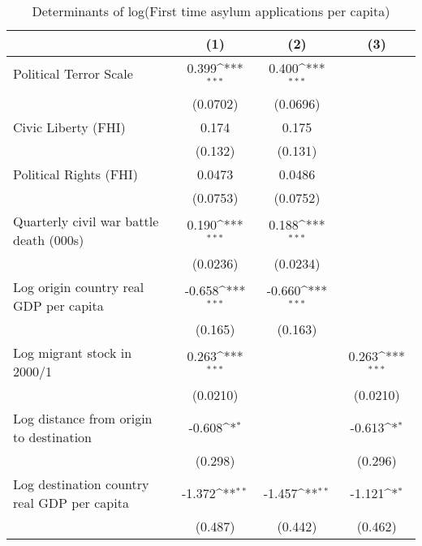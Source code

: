 \begin{table}[htbp]\centering
\def\sym#1{\ifmmode^{#1}\else\(^{#1}\)\fi}
\caption{Determinants of log(First time asylum applications per capita)}
\begin{tabular}{l*{3}{c}}
\hline\hline
                    &\multicolumn{1}{c}{(1)}         &\multicolumn{1}{c}{(2)}         &\multicolumn{1}{c}{(3)}         \\
\hline
Political Terror Scale&       0.399\sym{***}&       0.400\sym{***}&                     \\
                    &    (0.0702)         &    (0.0696)         &                     \\
[1em]
Civic Liberty (FHI) &       0.174         &       0.175         &                     \\
                    &     (0.132)         &     (0.131)         &                     \\
[1em]
Political Rights (FHI)&      0.0473         &      0.0486         &                     \\
                    &    (0.0753)         &    (0.0752)         &                     \\
[1em]
Quarterly civil war battle death (000s)&       0.190\sym{***}&       0.188\sym{***}&                     \\
                    &    (0.0236)         &    (0.0234)         &                     \\
[1em]
Log origin country real GDP per capita&      -0.658\sym{***}&      -0.660\sym{***}&                     \\
                    &     (0.165)         &     (0.163)         &                     \\
[1em]
Log migrant stock in 2000/1&       0.263\sym{***}&                     &       0.263\sym{***}\\
                    &    (0.0210)         &                     &    (0.0210)         \\
[1em]
Log distance from origin to destination&      -0.608\sym{*}  &                     &      -0.613\sym{*}  \\
                    &     (0.298)         &                     &     (0.296)         \\
[1em]
Log destination country real GDP per capita&      -1.372\sym{**} &      -1.457\sym{**} &      -1.121\sym{*}  \\
                    &     (0.487)         &     (0.442)         &     (0.462)         \\

\end{tabular}
\end{table}
